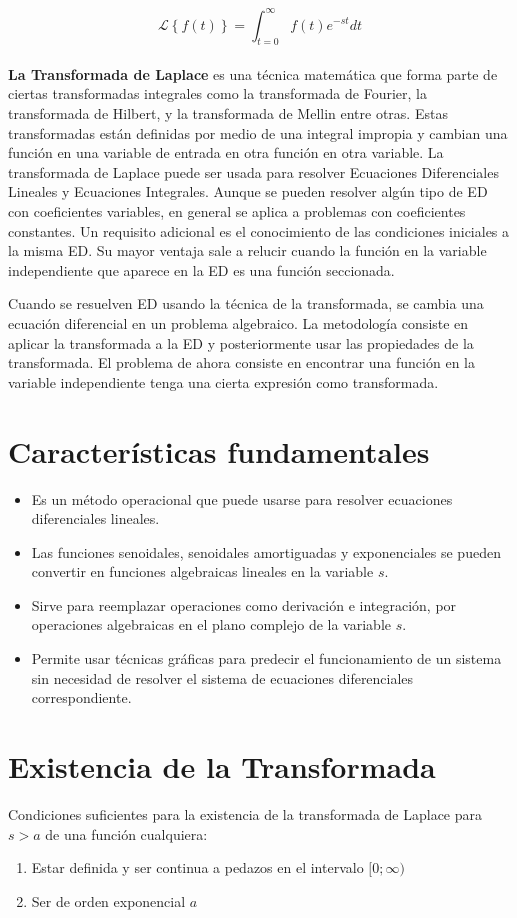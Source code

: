 \documentclass[12pt,a4paper,twoside,onecolumn,openany]{book}
\begin{document}
\[
    \mathcal { L }  \left\lbrace { f ( t )  }\right\rbrace = \int_ { t= 0 } ^ { \infty } f ( t ) e^ { -st } dt
\]
\\
\textbf{La Transformada de Laplace} es una técnica matemática que forma parte de ciertas transformadas integrales como la transformada de Fourier, la transformada de Hilbert, y la transformada de Mellin entre otras. Estas transformadas están definidas por medio de una integral impropia y cambian una función en una variable de entrada en otra función en otra variable. La transformada de Laplace puede ser usada para resolver Ecuaciones Diferenciales Lineales y Ecuaciones Integrales. Aunque se pueden resolver algún tipo de ED con coeficientes variables, en general se aplica a problemas con coeficientes constantes. Un requisito adicional es el conocimiento de las condiciones iniciales a la misma ED. Su mayor ventaja sale a relucir cuando la función en la variable independiente que aparece en la ED es una función seccionada.

Cuando se resuelven ED usando la técnica de la transformada, se cambia una ecuación diferencial en un problema algebraico. La metodología consiste en aplicar la transformada a la ED y posteriormente usar las propiedades de la transformada. El problema de ahora consiste en encontrar una función en la variable independiente tenga una cierta expresión como transformada.
\newpage
\section{Características fundamentales}
\begin{itemize}
\item Es un método operacional que puede usarse para resolver ecuaciones diferenciales lineales.
\item Las funciones senoidales, senoidales amortiguadas y exponenciales se pueden convertir en funciones algebraicas lineales en la variable $s$.
\item Sirve para reemplazar operaciones como derivación e integración, por operaciones algebraicas en el plano complejo de la variable $s$.
\item Permite usar técnicas gráficas para predecir el funcionamiento de un sistema sin necesidad de resolver el sistema de ecuaciones diferenciales correspondiente.
\end{itemize}
\section{Existencia de la Transformada}
Condiciones suficientes para la existencia de la transformada de Laplace para $s > a$ de una función cualquiera:
\begin{enumerate}
\item Estar definida y ser continua a pedazos en el intervalo $[0;\infty)$
\item Ser de orden exponencial $a$
\end{enumerate}
\end{document}
